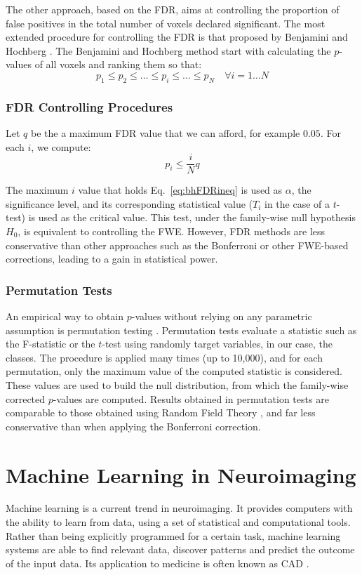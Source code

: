 The other approach, based on the \ac{FDR}, aims at controlling the proportion of false positives in the total number of voxels declared significant. The most extended procedure for controlling the \ac{FDR} is that proposed by Benjamini and Hochberg \cite{Benjamini1995}. The Benjamini and Hochberg method start with calculating the $p$-values of all voxels and ranking them so that:
\begin{equation}
p_1 \leq p_2 \leq \dots \leq p_i \leq \dots \leq p_N \quad \forall i=1\dots N
\end{equation}

\subsubsection{FDR Controlling Procedures}
Let $q$ be the a maximum \ac{FDR} value that we can afford, for example $0.05$. For each $i$, we compute:
\begin{equation}\label{eq:bhFDRineq}
p_i \leq \frac{i}{N}q
\end{equation}

The maximum $i$ value that holds Eq.~\ref{eq:bhFDRineq} is used as $\alpha$, the significance level, and its corresponding statistical value ($T_i$ in the case of a $t$-test) is used as the critical value. This test, under the family-wise null hypothesis $H_0$, is equivalent to controlling the \ac{FWE}. However, \ac{FDR} methods are less conservative than other approaches such as the Bonferroni or other \ac{FWE}-based corrections, leading to a gain in statistical power. 


\subsubsection{Permutation Tests}
An empirical way to obtain $p$-values without relying on any parametric assumption is permutation testing \cite{Anderson2001,Winkler2014}. Permutation tests evaluate a statistic such as the F-statistic or the $t$-test using randomly target variables, in our case, the classes. The procedure is applied many times (up to 10,000), and for each permutation, only the maximum value of the computed statistic is considered. These values are used to build the null distribution, from which the family-wise corrected $p$-values are computed. Results obtained in permutation tests are comparable to those obtained using Random Field Theory \cite{Winkler2014}, and far less conservative than when applying the Bonferroni correction. 

\section{Machine Learning in Neuroimaging}\label{sec:machinelearning}
Machine learning is a current trend in neuroimaging. It provides computers with the ability to learn from data, using a set of statistical and computational tools. Rather than being explicitly programmed for a certain task, machine learning systems are able to find relevant data, discover patterns and predict the outcome of the input data. Its application to medicine is often known as \acf{CAD} \cite{Martinez-Murcia2016}. 


